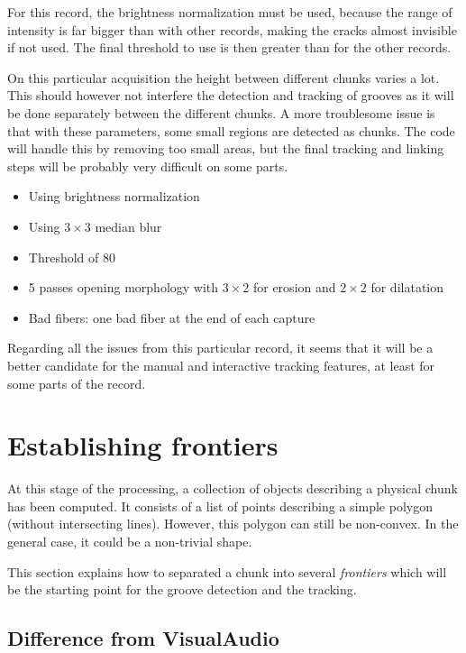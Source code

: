 For this record, the brightness normalization must be used, because the range of intensity is far bigger than with other records, making the cracks almost invisible if not used. The final threshold to use is then greater than for the other records.

On this particular acquisition the height between different chunks varies a lot. This should however not interfere the detection and tracking of grooves as it will be done separately between the different chunks. A more troublesome issue is that with these parameters, some small regions are detected as chunks. The code will handle this by removing too small areas, but the final tracking and linking steps will be probably very difficult on some parts.

\begin{itemize}
\item Using brightness normalization
\item Using $3 \times 3$ median blur
\item Threshold of 80
\item 5 passes opening morphology with $3 \times 2$ for erosion and $2 \times 2$ for dilatation
\item Bad fibers: one bad fiber at the end of each capture
\end{itemize}

Regarding all the issues from this particular record, it seems that it will be a better candidate for the manual and interactive tracking features, at least for some parts of the record.

\section{Establishing frontiers}
\label{sec:findfrontiers}

At this stage of the processing, a collection of objects describing a physical chunk has been computed. It consists of a list of points describing a simple polygon (without intersecting lines). However, this polygon can still be non-convex. In the general case, it could be a non-trivial shape.

This section explains how to separated a chunk into several \emph{frontiers} which will be the starting point for the groove detection and the tracking.

\subsection{Difference from VisualAudio}

